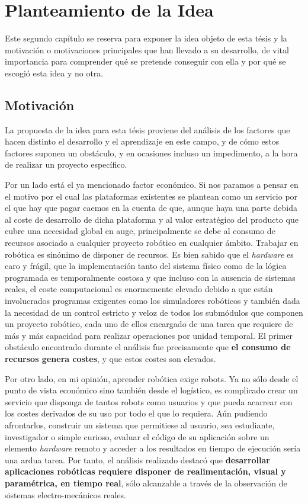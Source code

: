 \chapter{Planteamiento de la Idea}

Este segundo capítulo se reserva para exponer la idea objeto de esta tésis y la motivación o motivaciones principales que han llevado a su desarrollo, de vital importancia para comprender qué se pretende conseguir con ella y por qué se escogió esta idea y no otra.

\section{Motivación}

La propuesta de la idea para esta tésis proviene del análisis de los factores que hacen distinto el desarrollo y el aprendizaje en este campo, y de cómo estos factores suponen un obstáculo, y en ocasiones incluso un impedimento, a la hora de realizar un proyecto específico.

Por un lado está el ya mencionado factor económico. Si nos paramos a pensar en el motivo por el cual las plataformas existentes se plantean como un servicio por el que hay que pagar caemos en la cuenta de que, aunque haya una parte debida al coste de desarrollo de dicha plataforma y al valor estratégico del producto que cubre una necesidad global en auge, principalmente se debe al consumo de recursos asociado a cualquier proyecto robótico en cualquier ámbito. Trabajar en robótica es sinónimo de disponer de recursos. Es bien sabido que el \textit{hardware} es caro y frágil, que la implementación tanto del sistema físico como de la lógica programada es temporalmente costosa y que incluso con la ausencia de sistemas reales, el coste computacional es enormemente elevado debido a que están involucrados programas exigentes como los simuladores robóticos y también dada la necesidad de un control estricto y veloz de todos los submódulos que componen un proyecto robótico, cada uno de ellos encargado de una tarea que requiere de más y más capacidad para realizar operaciones por unidad temporal. El primer obstáculo encontrado durante el análisis fue precisamente que \textbf{el consumo de recursos genera costes}, y que estos costes son elevados.

Por otro lado, en mi opinión, aprender robótica exige robots. Ya no sólo desde el punto de vista económico sino también desde el logístico, es complicado crear un servicio que disponga de tantos robots como usuarios y que pueda acarrear con los costes derivados de su uso por todo el que lo requiera. Aún pudiendo afrontarlos, construir un sistema que permitiese al usuario, sea estudiante, investigador o simple curioso, evaluar el código de su aplicación sobre un elemento \textit{hardware} remoto y acceder a los resultados en tiempo de ejecución sería una ardua tarea. Por tanto, el análisis realizado destacó que \textbf{desarrollar aplicaciones robóticas requiere disponer de realimentación, visual y paramétrica, en tiempo real}, sólo alcanzable a través de la observación de sistemas electro-mecánicos reales.

